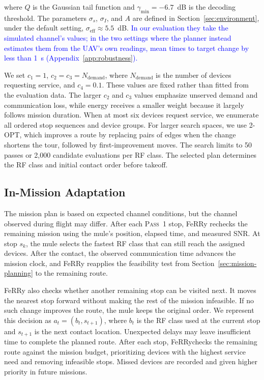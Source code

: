 \documentclass[conference]{IEEEtran}
\newcommand{\sysname}{FeRRy}
\begin{document}
where $Q$ is the Gaussian tail function and
$\gamma_{\min}=-6.7$~dB is the decoding threshold. The parameters
$\sigma_s$, $\sigma_I$, and $A$ are defined in
Section~\ref{sec:environment}, under the default setting,
$\sigma_{\mathrm{eff}}\approx5.5$~dB. \textcolor{blue}{In our evaluation they take
the simulated channel's values; in the two settings where the planner instead
estimates them from the UAV's own readings, mean times to target change by less
than 1~s (Appendix~\ref{app:robustness}).}

We set $c_1=1$, $c_2=c_3=N_{\mathrm{demand}}$, where
$N_{\mathrm{demand}}$ is the number of devices requesting service, and
$c_4=0.1$. These values are fixed rather than fitted from the evaluation data.
The larger $c_2$ and $c_3$ values emphasize
unserved demand and communication loss, while energy receives a smaller weight
because it largely follows mission duration. When at most six devices request service, we enumerate all ordered stop
sequences and device groups. For larger search spaces, we use 2-OPT, which improves a route by
replacing pairs of edges when the change shortens the tour, followed by
first-improvement moves. The search limits to 50 passes or 2,000
candidate evaluations per RF class. The selected plan determines the RF
class and initial contact order before takeoff.

\subsection{In-Mission Adaptation}
\label{sec:inmission}

The mission plan is based on expected channel conditions, but the channel
observed during flight may differ. After each \textsc{Pass~1} stop, \sysname{} rechecks the remaining
mission using the mule's position, elapsed time, and measured SNR. At stop $s_k$, the mule selects the fastest RF class that can still reach the assigned
devices. After the contact, the observed communication time
advances the mission clock, and \sysname{} reapplies the feasibility test from
Section~\ref{sec:mission-planning} to the remaining route.

\sysname{} also checks whether another remaining stop can be visited next. It
moves the nearest stop forward without making the rest of
the mission infeasible. If no such change improves the route, the mule keeps the
original order. We represent this decision as $a_t=(b_t,s_{t+1})$, where $b_t$ is the RF class used at the current stop and $s_{t+1}$ is the next
contact location. Unexpected delays may leave insufficient time to complete the planned route. After each stop, \sysname checks the remaining route against the mission budget, prioritizing devices with the highest service need and removing infeasible stops. Missed devices are recorded and given higher priority in future missions.
\end{document}
